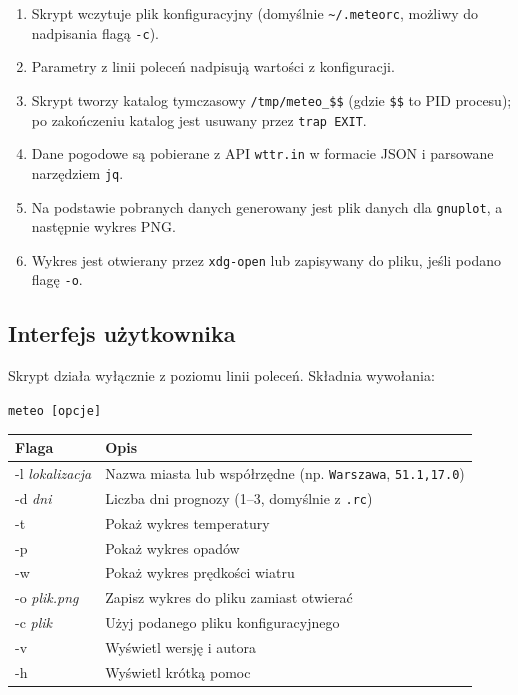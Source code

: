 \documentclass[a4paper,11pt]{article}
\begin{document}
\begin{enumerate}[noitemsep]
    \item Skrypt wczytuje plik konfiguracyjny (domyślnie \texttt{\textasciitilde/.meteorc},
          możliwy do nadpisania flagą \texttt{-c}).
    \item Parametry z linii poleceń nadpisują wartości z konfiguracji.
    \item Skrypt tworzy katalog tymczasowy \texttt{/tmp/meteo\_\$\$} (gdzie \texttt{\$\$}
          to PID procesu); po zakończeniu katalog jest usuwany przez \texttt{trap EXIT}.
    \item Dane pogodowe są pobierane z API \texttt{wttr.in} w formacie JSON
          i parsowane narzędziem \texttt{jq}.
    \item Na podstawie pobranych danych generowany jest plik danych dla
          \texttt{gnuplot}, a następnie wykres PNG.
    \item Wykres jest otwierany przez \texttt{xdg-open} lub zapisywany do pliku,
          jeśli podano flagę \texttt{-o}.
\end{enumerate}

\subsection*{Interfejs użytkownika}

Skrypt działa wyłącznie z poziomu linii poleceń. Składnia wywołania:

\begin{center}
\texttt{meteo [opcje]}
\end{center}

\vspace{4pt}
\begin{tabular}{>{\ttfamily}lp{10cm}}
\toprule
\textrm{Flaga} & Opis \\
\midrule
-l \textit{lokalizacja} & Nazwa miasta lub współrzędne (np. \texttt{Warszawa}, \texttt{51.1,17.0}) \\
-d \textit{dni}         & Liczba dni prognozy (1--3, domyślnie z \texttt{.rc}) \\
-t                      & Pokaż wykres temperatury \\
-p                      & Pokaż wykres opadów \\
-w                      & Pokaż wykres prędkości wiatru \\
-o \textit{plik.png}    & Zapisz wykres do pliku zamiast otwierać \\
-c \textit{plik}        & Użyj podanego pliku konfiguracyjnego \\
-v                      & Wyświetl wersję i autora \\
-h                      & Wyświetl krótką pomoc \\
\bottomrule
\end{tabular}
\end{document}
